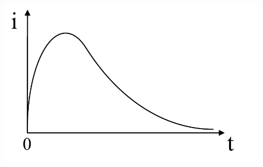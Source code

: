 \documentclass{article}
\begin{document}
\begin{itemize}
        \begin{center}
            \includegraphics[scale=0.2]{Image/RLC_2.png}
        \end{center}


\end{itemize}
\end{document}
